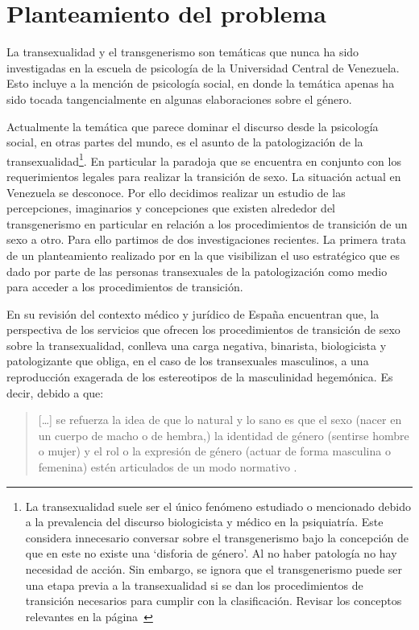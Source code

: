\section{Planteamiento del problema}

La transexualidad y el transgenerismo son temáticas que nunca ha sido
investigadas en la escuela de psicología de la Universidad Central de Venezuela. Esto incluye a la mención de psicología
social, en donde la temática apenas ha sido tocada tangencialmente en algunas
elaboraciones sobre el género.

Actualmente la temática que parece dominar el discurso desde la psicología
social, en otras partes del mundo, es el asunto de la patologización de la
transexualidad\footnote{La transexualidad suele ser el único fenómeno estudiado
o mencionado debido a la prevalencia del discurso biologicista y médico en la
psiquiatría. Este considera innecesario conversar sobre el transgenerismo bajo
la concepción de que en este no existe una ‘disforia de género’. Al no haber
patología no hay necesidad de acción. Sin embargo, se ignora que el
transgenerismo puede ser una etapa previa a la transexualidad si se dan los
procedimientos de transición necesarios para cumplir con la clasificación.
Revisar los conceptos relevantes en la página~\pageref{diferencia}}. En
particular la paradoja que se encuentra en conjunto con los requerimientos
legales para realizar la transición de sexo. La situación actual en Venezuela se
desconoce. Por ello decidimos realizar un estudio de las percepciones,
imaginarios y concepciones que existen alrededor del transgenerismo en
particular en relación a los procedimientos de transición de un sexo a otro.
Para ello partimos de dos investigaciones recientes. La primera trata de un
planteamiento realizado por \textcite{Coll-Planas2015} en la que visibilizan el
uso estratégico que es dado por parte de las personas transexuales de la
patologización como medio para acceder a los procedimientos de transición.

En su revisión del contexto médico y jurídico de España encuentran que, la
perspectiva de los servicios que ofrecen los procedimientos de transición de
sexo sobre la transexualidad, conlleva una carga negativa, binarista,
biologicista y patologizante que obliga, en el caso de los transexuales
masculinos, a una reproducción exagerada de los estereotipos de la masculinidad
hegemónica. Es decir, debido a que:

\begin{quote}
[…] se refuerza la idea de que lo natural y lo sano es que el sexo (nacer en un
cuerpo de macho o de hembra,) la identidad de género (sentirse hombre o
mujer) y el rol o la expresión de género (actuar de forma masculina o
femenina) estén articulados de un modo normativo \parencite[][p.
426]{Coll-Planas2015}.
\end{quote}

